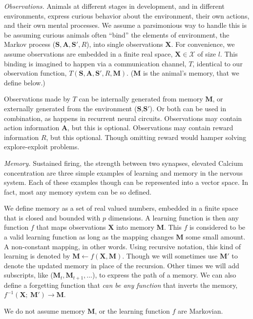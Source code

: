 \emph{Observations.} Animals at different stages in development, and in different environments, express curious behavior about the environment, their own actions, and their own mental processes. We assume a parsimonious way to handle this is be assuming curious animals often ``bind'' \cite{Robertson2003} the elements of environment, the Markov process ($\mathbf{S},\mathbf{A},\mathbf{S'},R$), into single observations $\mathbf{X}$. For convenience, we assume observations are embedded in a finite real space, $\mathbf{X} \in \mathcal{X}$ of size $l$. This binding is imagined to happen via a communication channel, $T$, identical to our observation function, $T(\mathbf{S},\mathbf{A},\mathbf{S'},R,\mathbf{M})$. ($\mathbf{M}$ is the animal's memory, that we define below.)

Observations made by $T$ can be internally generated from memory $\mathbf{M}$, or externally generated from the environment ($\mathbf{S}$,$\mathbf{S'}$). Or both can be used in combination, as happens in recurrent neural circuits. Observations may contain action information $\mathbf{A}$, but this is optional. Observations may contain reward information $R$, but this optional. Though omitting reward would hamper solving explore-exploit problems. 

\emph{Memory.} Sustained firing, the strength between two synapses, elevated Calcium concentration are three simple examples of learning and memory in the nervous system. Each of these examples though can be represented into a vector space. In fact, most any memory system can be so defined. 

We define memory as a set of real valued numbers, embedded in a finite space that is closed and bounded with $p$ dimensions. A learning function is then any function $f$ that maps observations $\mathbf{X}$ into memory $\mathbf{M}$. This $f$ is considered to be a valid learning function as long as the mapping changes $\mathbf{M}$ some small amount. A non-constant mapping, in other words. Using recursive notation, this kind of learning is denoted by $\mathbf{M} \leftarrow f(\mathbf{X},\mathbf{M}) $. Though we will sometimes use $\mathbf{M'}$ to denote the updated memory in place of the recursion. Other times we will add subscripts, like ($\mathbf{M}_t,\mathbf{M}_{t+1},\ldots$), to express the path of a memory. We can also define a forgetting function that \textit{can be any function} that inverts the memory, $f^{-1}(\mathbf{X};\ \mathbf{M}') \rightarrow \mathbf{M}$. 

We do not assume memory $\mathbf{M}$, or the learning function $f$ are Markovian.

